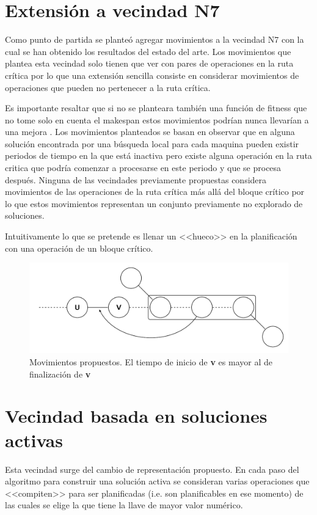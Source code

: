 \section{Extensión a vecindad N7}
Como punto de partida se planteó agregar movimientos a la vecindad N7 con la cual se han obtenido los resultados del estado del arte.
Los movimientos que plantea esta vecindad solo tienen que ver con pares de operaciones en la ruta crítica por lo que una extensión sencilla consiste en considerar movimientos de operaciones que pueden no pertenecer a la ruta crítica.

Es importante resaltar que si no se planteara también una función de fitness que no tome solo en cuenta el makespan estos movimientos podrían nunca llevarían a una mejora \cite{blazewicz1996job}. 
Los movimientos planteados se basan en observar que en alguna solución encontrada por una búsqueda local para cada maquina pueden existir periodos de tiempo en la que está inactiva pero existe alguna operación en la ruta critica que podría comenzar a procesarse en este periodo y que se procesa después. Ninguna de las vecindades previamente propuestas considera movimientos de las operaciones de la ruta crítica más allá del bloque crítico por lo que estos movimientos representan un conjunto previamente no explorado de soluciones.

Intuitivamente lo que se pretende es llenar un <<hueco>> en la planificación con una operación de un bloque crítico.

\begin{figure}[H]
\centering
\includegraphics[scale=.7]{Imagenes/N8.pdf}
    \caption{Movimientos propuestos. El tiempo de inicio de \textbf{v} es mayor al de finalización de \textbf{v}}
\end{figure}

\section{Vecindad basada en soluciones activas}
Esta vecindad surge del cambio de representación propuesto. En cada paso del algoritmo para construir una solución activa se consideran varias operaciones que <<compiten>> para ser planificadas (i.e. son planificables en ese momento) de las cuales se elige la que tiene la llave de mayor valor numérico. 

